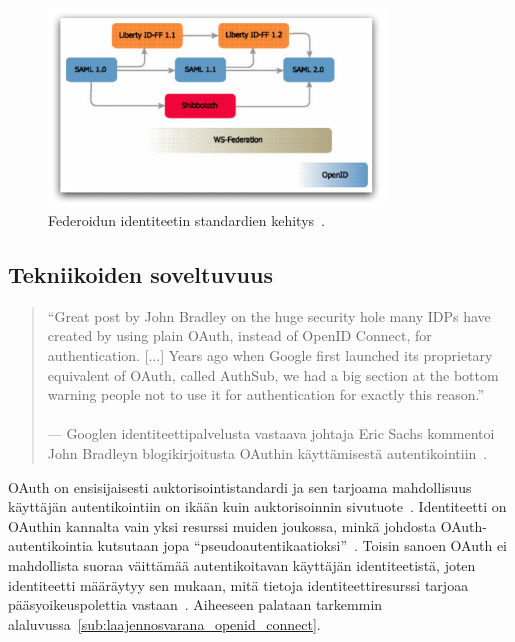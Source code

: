 \documentclass[finnish,gradu]{tktltiki}
\begin{document}
  \begin{figure}
    \centering
    \includegraphics[width=0.8\textwidth]{images/federoidun_id_standardien_kehitys.jpg}
    \caption[Federoidun identiteetin standardien kehitys.]{Federoidun identiteetin standardien kehitys~\cite{ping_identity_primer_federated_id_2010}.}
    \label{fig:federoidun_id_standardien_kehitys}
  \end{figure}


  \newpage
  \subsection{Tekniikoiden soveltuvuus} %
  \label{sub:tekniikoiden_yhtäläisyydet}

  \begin{quote}
    ``Great post by John Bradley on the huge security hole many IDPs have created by using plain OAuth, instead of OpenID Connect, for authentication. [...] Years ago when Google first launched its proprietary equivalent of OAuth, called AuthSub, we had a big section at the bottom warning people not to use it for authentication for exactly this reason.''
    \\
    \\--- Googlen identiteettipalvelusta vastaava johtaja Eric Sachs
     kommentoi~\cite{sachs_comment_on_oauth_authentication_2012}
     John Bradleyn blogikirjoitusta OAuthin käyttämisestä
     autentikointiin~\cite{bradley_oauth_authentication_problem_2012}.
  \end{quote}

  OAuth on ensisijaisesti auktorisointistandardi ja sen tarjoama mahdollisuus käyttäjän autentikointiin on ikään kuin auktorisoinnin sivutuote~\cite{bradley_facebook_for_authentication_2012}. Identiteetti on OAuthin kannalta vain yksi resurssi muiden joukossa, minkä johdosta OAuth-autentikointia kutsutaan jopa ``pseudoautentikaatioksi''~\cite{sakimura_dummydiff_oauth_openid_2011}. Toisin sanoen \mbox{OAuth} ei mahdollista suoraa väittämää autentikoitavan käyttäjän identiteetistä, joten identiteetti määräytyy sen mukaan, mitä tietoja identiteettiresurssi tarjoaa pääsyoikeuspolettia vastaan~\cite{bradley_oauth_implicit_flow_vulnerability_2012}. Aiheeseen palataan tarkemmin alaluvussa~\ref{sub:laajennosvarana_openid_connect}.
\end{document}
